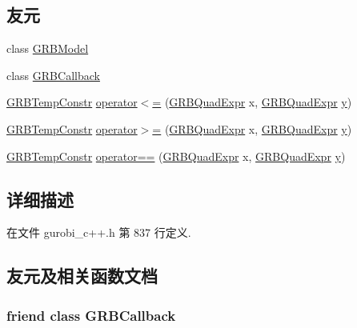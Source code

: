 \subsection*{友元}
\begin{DoxyCompactItemize}
\item 
class \hyperlink{classGRBTempConstr_a43690ac42cca6dade14d7fde97306d59}{G\+R\+B\+Model}
\item 
class \hyperlink{classGRBTempConstr_acfba07303dba169ec36e15619375c9b5}{G\+R\+B\+Callback}
\item 
\hyperlink{classGRBTempConstr}{G\+R\+B\+Temp\+Constr} \hyperlink{classGRBTempConstr_a5578d60d4a07924ed066ee6639f827be}{operator$<$=} (\hyperlink{classGRBQuadExpr}{G\+R\+B\+Quad\+Expr} x, \hyperlink{classGRBQuadExpr}{G\+R\+B\+Quad\+Expr} \hyperlink{classes_8txt_a52673b1e0cce0104e52dcd12727f211e}{y})
\item 
\hyperlink{classGRBTempConstr}{G\+R\+B\+Temp\+Constr} \hyperlink{classGRBTempConstr_a7463501c248daf2c0b81020effc36e8b}{operator$>$=} (\hyperlink{classGRBQuadExpr}{G\+R\+B\+Quad\+Expr} x, \hyperlink{classGRBQuadExpr}{G\+R\+B\+Quad\+Expr} \hyperlink{classes_8txt_a52673b1e0cce0104e52dcd12727f211e}{y})
\item 
\hyperlink{classGRBTempConstr}{G\+R\+B\+Temp\+Constr} \hyperlink{classGRBTempConstr_a172ca575c3ca0c2024c2dc316abb58c1}{operator==} (\hyperlink{classGRBQuadExpr}{G\+R\+B\+Quad\+Expr} x, \hyperlink{classGRBQuadExpr}{G\+R\+B\+Quad\+Expr} \hyperlink{classes_8txt_a52673b1e0cce0104e52dcd12727f211e}{y})
\end{DoxyCompactItemize}


\subsection{详细描述}


在文件 gurobi\+\_\+c++.\+h 第 837 行定义.



\subsection{友元及相关函数文档}
\subsubsection[{\texorpdfstring{G\+R\+B\+Callback}{GRBCallback}}]{\setlength{\rightskip}{0pt plus 5cm}friend class {\bf G\+R\+B\+Callback}\hspace{0.3cm}{\ttfamily [friend]}}\hypertarget{classGRBTempConstr_acfba07303dba169ec36e15619375c9b5}{}\label{classGRBTempConstr_acfba07303dba169ec36e15619375c9b5}


